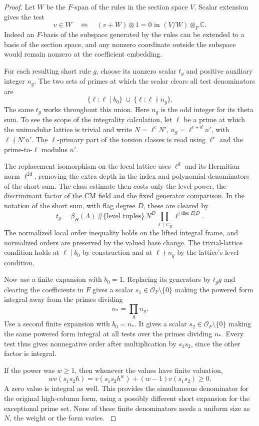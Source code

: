 \begin{proof}
Let \(W\) be the \(F\)-span of the rules in the section space \(V\). Scalar extension gives the test
\[
 v\in W\quad\Longleftrightarrow\quad (v+W)\otimes1=0\text{ in }(V/W)\otimes_F\mathbb C.
\]
Indeed an
\(F\)-basis of the subspace generated by the rules can be
extended to a basis of the section space, and any nonzero
coordinate outside the subspace would remain nonzero at the
coefficient embedding.
\label{cor:deep-cover-denominators-9}

For each resulting short rule \(g\), choose its nonzero scalar
\(t_g\) and positive auxiliary integer \(n_g\). The two sets of
primes at which the scalar clears all test denominators are
\[
       \{\ell:\ell\mid b_0\}\ \cup\ \{\ell:\ell\nmid n_g\}.
\]
The same \(t_g\) works throughout this union. Here \(n_g\) is the
odd integer for its theta sum. To see the scope of the
integrality calculation, let \(\ell\) be a prime at which the
unimodular lattice is trivial and write
\(N=\ell^cN'\), \(n_g=\ell^{c+d}n'\), with
\(\ell\nmid N'n'\). The \(\ell\)-primary part of the torsion
classes is read using \(\ell^c\) and the prime-to-\(\ell\)
modulus \(n'\).

The replacement isomorphism on the local
lattice uses \(\ell^d\) and its Hermitian norm
\(\ell^{2d}\), removing the extra depth in the index and
polynomial denominators of the short sum. The class estimate
then costs only the level power, the discriminant factor of the CM field
and the fixed generator comparison. In the notation of the
short sum, with flag degree \(D\), these are cleared by
\[
 t_g=\beta_H(\Lambda)\,
       \#\{\text{level tuples}\}\,
       N^{D}\prod_{\ell\mid C_E}\ell^{|\operatorname{disc}E|D}.
\]
The normalized local order inequality holds on the lifted
integral frame, and normalized orders are preserved by the
valued base change. The trivial-lattice condition holds at
\(\ell\mid b_0\) by construction and at \(\ell\nmid n_g\)
by the lattice's level condition.
\label{cor:deep-cover-denominators-10}

Now use a finite expansion with \(b_0=1\). Replacing its
generators by \(t_g g\) and clearing the coefficients in
\(F\) gives a scalar \(s_1\in\mathcal O_F\setminus\{0\}\)
making the powered form integral away from the primes
dividing
\[
 n_* =\prod_g n_g.
\]
Use a second finite expansion
with \(b_0=n_*\). It gives a scalar
\(s_2\in\mathcal O_F\setminus\{0\}\) making the same
powered form integral at all tests over the primes dividing
\(n_*\). Every test thus gives nonnegative order after
multiplication by \(s_1s_2\), since the other factor is
integral.

If the power was \(w\ge1\), then whenever the values have finite valuation,
\[
 wv(s_1s_2 h)=v(s_1s_2 h^w)+(w-1)v(s_1s_2)\ge0 .
\]
A zero value is integral as well. This provides the
simultaneous denominator for the original high-column
form, using a possibly different short expansion for the
exceptional prime set. None of these finite denominators
needs a uniform size as \(N\), the weight or the form varies.
\label{cor:deep-cover-denominators-11}
\end{proof}
